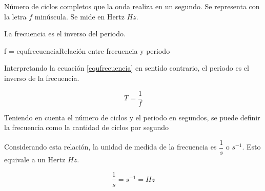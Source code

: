 Número de ciclos completos que la onda realiza en un segundo. Se representa con la letra $f$ minúscula. Se mide en Hertz $Hz$.


La frecuencia es el inverso del periodo.

\begin{listequbox}
  {f = }{equfrecuencia}{Relación entre frecuencia y periodo}
\end{listequbox}

Interpretando la ecuación \ref{equfrecuencia} en sentido contrario, el periodo es el inverso de la frecuencia.

\[\boxed{
  T = \dfrac{1}{f}
}\]

Teniendo en cuenta el número de ciclos y el periodo en segundos, se puede definir la frecuencia como la cantidad de ciclos por segundo

Considerando esta relación, la unidad de medida de la frecuencia es $\dfrac{1}{s}$ o $s^{-1}$. Esto equivale a un Hertz $Hz$.

\[\boxed{
  \dfrac{1}{s}=s^{-1}=Hz
}\]
